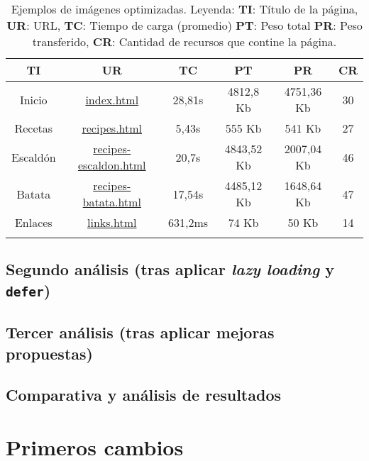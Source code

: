 \documentclass{article}
\begin{document}
\begin{longtable}{c|c|c|c|c|c}
    \hline
    \textbf{TI} & \textbf{UR} & \textbf{TC} & \textbf{PT} & \textbf{PR} & \textbf{CR} \\
    \endhead
    \hline
    Inicio & \href{https://www.danielramos.me/hhyc-dramosac/index.html}{index.html} & 28,81s & 4812,8 Kb & 4751,36 Kb & 30 \\
    Recetas & \href{https://www.danielramos.me/hhyc-dramosac/recipes.html}{recipes.html} & 5,43s & 555 Kb & 541 Kb & 27 \\
    Escaldón & \href{https://www.danielramos.me/hhyc-dramosac/recipes-escaldon.html}{recipes-escaldon.html} & 20,7s & 4843,52 Kb & 2007,04 Kb & 46 \\
    Batata & \href{https://www.danielramos.me/hhyc-dramosac/recipes-batata.html}{recipes-batata.html} & 17,54s & 4485,12 Kb & 1648,64 Kb & 47 \\
    Enlaces & \href{https://www.danielramos.me/hhyc-dramosac/links.html}{links.html} & 631,2ms & 74 Kb & 50 Kb & 14 \\
    \hline
    \caption{
        Ejemplos de imágenes optimizadas.
        Leyenda: 
        \textbf{TI}: Título de la página, 
        \textbf{UR}: URL, 
        \textbf{TC}: Tiempo de carga (promedio) 
        \textbf{PT}: Peso total 
        \textbf{PR}: Peso transferido, 
        \textbf{CR}: Cantidad de recursos que contine la página.
    }
    \label{tab:imagenes-optimizadas}
\end{longtable}

\subsection{Segundo análisis (tras aplicar \textit{lazy loading} y \texttt{defer})}\label{sec:segundo-analisis}

\subsection{Tercer análisis (tras aplicar mejoras propuestas)}\label{sec:tercer-analisis}

\subsection{Comparativa y análisis de resultados}\label{sec:comparativa-y-analisis-de-resultados}

\section{Primeros cambios}\label{sec:primeros-cambios}
\end{document}
